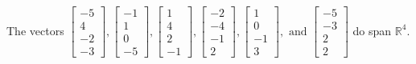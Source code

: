 \begin{exercise}
\begin{exerciseStatement}
  \end{exerciseStatement}
  \begin{exerciseAnswer}
   The vectors \(\left[\begin{array}{r}
-5 \\
4 \\
-2 \\
-3
\end{array}\right] , \left[\begin{array}{r}
-1 \\
1 \\
0 \\
-5
\end{array}\right] , \left[\begin{array}{r}
1 \\
4 \\
2 \\
-1
\end{array}\right] , \left[\begin{array}{r}
-2 \\
-4 \\
-1 \\
2
\end{array}\right] , \left[\begin{array}{r}
1 \\
0 \\
-1 \\
3
\end{array}\right] , \text{ and } \left[\begin{array}{r}
-5 \\
-3 \\
2 \\
2
\end{array}\right]\) 
  	 do  
	span \(\mathbb{R}^4\).
  


  \end{exerciseAnswer}
\end{exercise}
